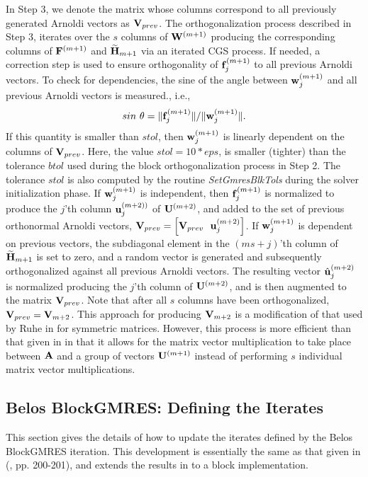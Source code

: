 \documentclass{article}
\newcommand{\bA}{{\bf A}}
\newcommand{\bF}{{\bf F}}
\newcommand{\bH}{{\bf H}}
\newcommand{\bU}{{\bf U}}
\newcommand{\bV}{{\bf V}}
\newcommand{\bW}{{\bf W}}
\newcommand{\bu}{{\bf u}}
\newcommand{\bw}{{\bf w}}
\newcommand{\dm}{\begin{displaymath}}
\newcommand{\edm}{\end{displaymath}}
\begin{document}
In Step 3, we denote the matrix whose columns correspond to all
previously generated Arnoldi vectors as $\bV_{prev}$. The
orthogonalization process described in Step 3, iterates over the
$s$ columns of $\bW^{(m+1)}$ producing the corresponding columns
of $\bF^{(m+1)}$ and ${\widetilde \bH}_{m+1}$ via an iterated CGS
process. If needed, a correction step is used to ensure
orthogonality of ${\bf f}_j^{(m+1)}$ to all previous Arnoldi
vectors. To check for dependencies, the sine of the angle between
$\bw_j^{(m+1)}$ and all previous Arnoldi vectors is measured.,
i.e.,
 \dm
 sin~\theta = \| {\bf f}_j^{(m+1)} \| / \| \bw_j^{(m+1)} \|.
 \edm
If this quantity is smaller than $stol$, then $\bw_j^{(m+1)}$ is
linearly dependent on the columns of $\bV_{prev}$. Here, the value
$stol = 10 * eps$, is smaller (tighter) than the tolerance $btol$
used during the block orthogonalization process in Step 2. The
tolerance $stol$ is also computed by the routine {\it
SetGmresBlkTols} during the solver initialization phase. If
$\bw_j^{(m+1)}$ is independent, then ${\bf f}_j^{(m+1)}$ is
normalized to produce the $j$'th column $\bu_j^{(m+2))}$ of
$\bU^{(m+2)}$, and added to the set of previous orthonormal
Arnoldi vectors, $\bV_{prev} = \left[ \bV_{prev} ~~ \bu_j^{(m+2)}
\right]$. If $\bw_j^{(m+1)}$ is dependent on previous vectors, the
subdiagonal element in the $(ms+j)$'th column of ${\widetilde
\bH}_{m+1}$ is set to zero, and a random vector is generated and
subsequently orthogonalized against all previous Arnoldi vectors.
The resulting vector ${\hat \bu}_j^{(m+2)}$ is normalized
producing the $j$'th column of $\bU^{(m+2)}$, and is then
augmented to the matrix $\bV_{prev}$. Note that after all $s$
columns have been orthogonalized, $\bV_{prev} = \bV_{m+2}$. This
approach for producing $\bV_{m+2}$ is a modification of that used
by Ruhe in \cite{ruhe:79} for symmetric matrices. However, this
process is more efficient than that given in \cite{ruhe:79} in
that it allows for the matrix vector multiplication to take place
between $\bA$ and a group of vectors $\bU^{(m+1)}$ instead of
performing $s$ individual matrix vector multiplications.



\subsection{Belos BlockGMRES: Defining the Iterates}
\label{sec:belosblkgmres}

This section gives the details of how to update the iterates
defined by the Belos BlockGMRES iteration. This development is
essentially the same as that given in (\cite{Sa96}, pp. 200-201),
and extends the results in \cite{SS86} to a block implementation.
\end{document}
